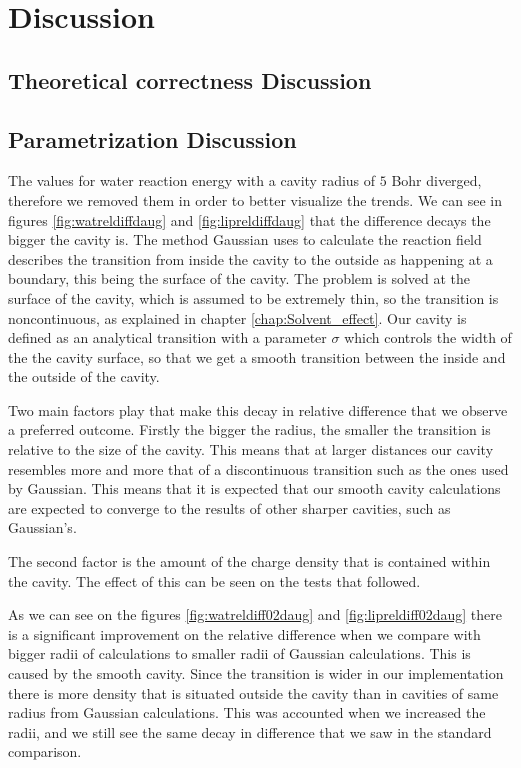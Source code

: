 \documentclass[../master_thesis.tex]{subfiles}
\begin{document}
\section{Discussion}
\subsection{Theoretical correctness Discussion}
\subsection{Parametrization Discussion}
The values for water reaction energy with a cavity radius of $5$ Bohr diverged, therefore
we removed them in order to better visualize the trends.
We can see in figures \ref{fig:watreldiffdaug} and \ref{fig:lipreldiffdaug}
that the difference decays the bigger the cavity is. The method Gaussian
uses to calculate the reaction field describes the transition from inside the
cavity to the outside as happening at a boundary, this being the surface of the cavity.
The problem is solved at the surface of the cavity, which is assumed to be extremely
thin, so the transition is noncontinuous, as explained in chapter \ref{chap:Solvent_effect}.
Our cavity is defined as an analytical transition with a parameter $\sigma$ which
controls the width of the the cavity surface, so that we get a smooth transition
between the inside and the outside of the cavity.

Two main factors play that make this decay in relative difference that we observe
a preferred outcome. Firstly the bigger the radius, the smaller the transition is
relative to the size of the cavity. This means that at larger distances our cavity
resembles more and more that of a discontinuous transition such as the ones used
by Gaussian. This means that it is expected that our smooth cavity calculations are expected
to converge to the results of other sharper cavities, such as Gaussian's.

The second factor is the amount of the charge density that is contained within
the cavity. The effect of this can be seen on the tests that followed.

As we can see on the figures \ref{fig:watreldiff02daug} and \ref{fig:lipreldiff02daug}
there is a significant improvement on the relative difference when we compare with
bigger radii of \mrchem calculations to smaller radii of Gaussian calculations.
This is caused by the smooth cavity. Since the transition is wider in our implementation
there is more density that is situated outside the cavity than in cavities of same radius
from Gaussian calculations. This was accounted when we increased the radii, and we still
see the same decay in difference that we saw in the standard comparison.
\end{document}
